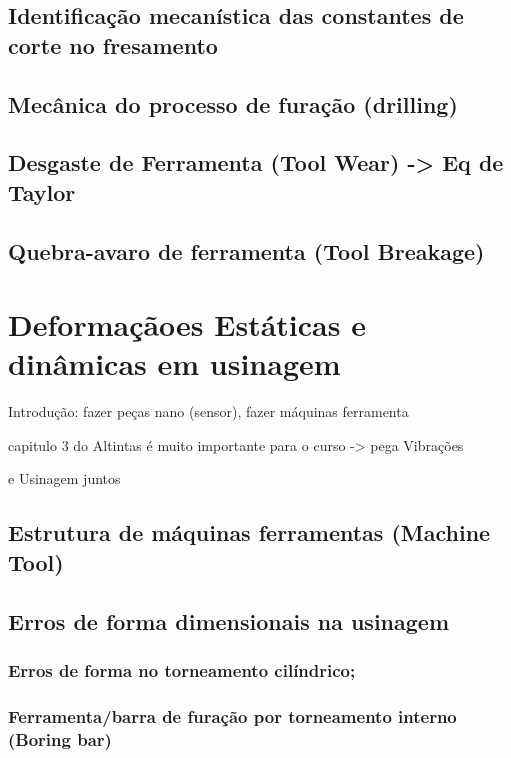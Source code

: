 \section{Identificação mecanística das constantes de corte no fresamento}

\section{Mecânica do processo de furação (drilling)}

\section{Desgaste de Ferramenta (Tool Wear) -> Eq de Taylor}

\section{Quebra-avaro de ferramenta (Tool Breakage)}

\chapter{Deformaçãoes Estáticas e dinâmicas em usinagem}

Introdução: fazer peças nano (sensor), fazer máquinas ferramenta

capitulo 3 do Altintas é muito importante para o curso -> pega Vibrações

e Usinagem juntos

\section{Estrutura de máquinas ferramentas (Machine Tool)}

\section{Erros de forma dimensionais na usinagem}

\subsection{Erros de forma no torneamento cilíndrico;}

\subsection{Ferramenta/barra de furação por torneamento interno (Boring bar)}


